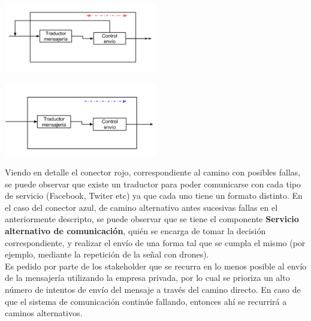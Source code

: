 \documentclass[a4paper, 11pt]{article}
\begin{document}
\centerline{\includegraphics[width=0.5\textwidth]{./diagramas/ArqTP2Envio.png}}
\centerline{\includegraphics[width=0.5\textwidth]{./diagramas/ArqTP2conector2.png}}

Viendo en detalle el conector rojo, correspondiente al camino con posibles fallas, se puede observar que existe un traductor para poder comunicarse con cada tipo de servicio (Facebook, Twiter etc) ya que cada uno tiene un formato distinto.
En el caso del conector azul, de camino alternativo antes sucesivas fallas en el anteriormente descripto, se puede observar que se tiene el componente \textbf{Servicio alternativo de comunicación}, quién se encarga de tomar la decisión correspondiente, y realizar el envío de una forma tal que se cumpla el mismo (por ejemplo, mediante la repetición de la se\~nal con drones).\\


Es pedido por parte de los stakeholder que se recurra en lo menos posible al envío de la mensajería utilizando la empresa privada, por lo cual se prioriza un alto número de intentos de envío del mensaje a través del camino directo. En caso de que el sistema de comunicación continúe fallando, entonces ahí se recurrirá a caminos alternativos. \\
\end{document}
